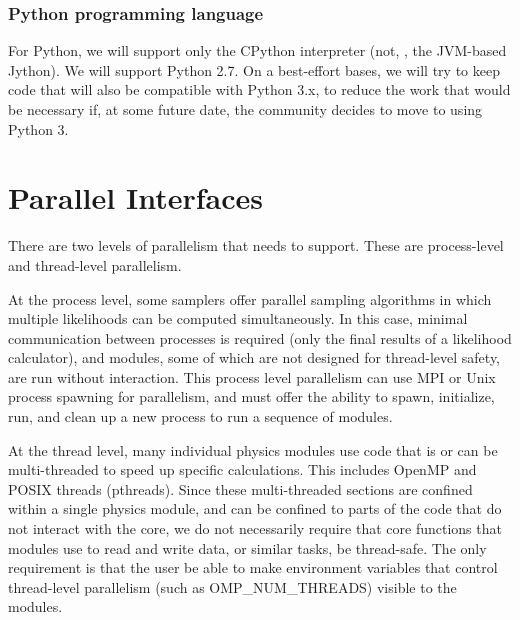 \documentclass[draftmode,draftwater]{memarticle}
\newcommand{\cosmosis}{\name{CosmoSIS}\xspace}
\begin{document}
\subsubsection{Python programming language}

For Python, we will support only the CPython interpreter (not, \eg, the
JVM-based Jython). We will support Python 2.7. On a best-effort bases,
we will try to keep code that will also be compatible with Python 3.x,
to reduce the work that would be necessary if, at some future date, the
community decides to move to using Python 3.

\section{Parallel Interfaces}


There are two levels of parallelism that \cosmosis needs to support.  These are
process-level and thread-level parallelism.

At the process level, some samplers 
offer parallel sampling algorithms in which multiple likelihoods can be computed 
simultaneously.  In this case, minimal communication between processes is required
(only the final results of a likelihood calculator), and modules, some of which are
not designed for thread-level safety, are run without interaction.  This process level
parallelism can use MPI or Unix process spawning for parallelism, and \cosmosis must offer
the ability to spawn, initialize, run, and clean up a new process to run a sequence of modules.

At the thread level, many individual physics modules use code that is or can be multi-threaded
to speed up specific calculations. This includes OpenMP and POSIX threads (pthreads).  Since these
multi-threaded sections are confined within a single physics module, and can be confined to 
parts of the code that do not interact with the \cosmosis core, we do not necessarily require that core functions
that modules use to read and write data, or similar tasks, be thread-safe.  The only requirement
is that the user be able to make environment variables that control thread-level parallelism
(such as OMP\_NUM\_THREADS) visible to the modules.
\end{document}
